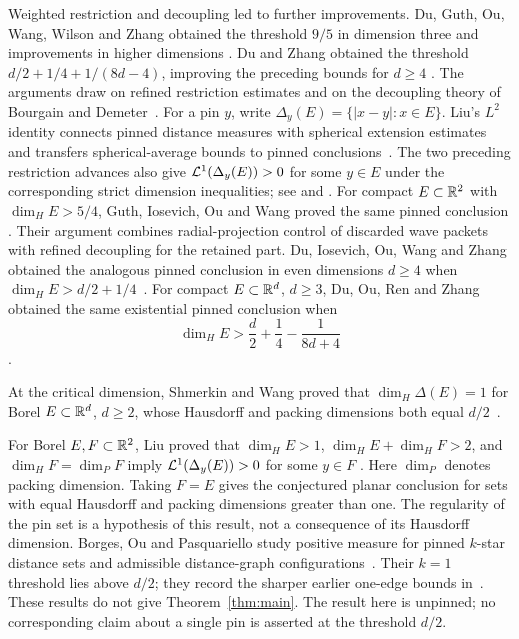 Weighted restriction and decoupling led to further improvements.
Du, Guth, Ou, Wang, Wilson and Zhang obtained the threshold \(9/5\)
in dimension three and improvements in higher dimensions
\cite[Theorem~1.2]{DGOWWZ2021}. Du and Zhang obtained the threshold
\(d/2+1/4+1/(8d-4)\), improving the preceding bounds for \(d\ge4\)
\cite[Theorem~2.6]{DZ2019}.
The arguments draw on refined restriction estimates and on the
decoupling theory of Bourgain and Demeter~\cite{BD2015}.
For a pin \(y\), write
\(\Delta_y(E)=\{|x-y|:x\in E\}\).
Liu's \(L^2\) identity connects pinned distance measures with spherical
extension estimates and transfers spherical-average bounds to pinned
conclusions~\cite[Theorems~1.4 and~1.9]{Liu2019}.
The two preceding restriction advances also give
\(\mathcal L^1(\Delta_y(E))>0\) for some \(y\in E\) under the corresponding
strict dimension inequalities; see \cite[Corollary~1.11]{DGOWWZ2021}
and \cite[Theorem~2.7]{DZ2019}.
For compact \(E\subset\mathbb R^2\) with \(\dim_HE>5/4\),
Guth, Iosevich, Ou and Wang proved the same pinned conclusion
\cite[Theorem~1.2]{GIOW2020}.
Their argument combines radial-projection control of discarded wave
packets with refined decoupling for the retained part.
Du, Iosevich, Ou, Wang and Zhang obtained the analogous pinned conclusion
in even dimensions \(d\ge4\) when
\(\dim_HE>d/2+1/4\)~\cite[Theorem~1.2]{DIOWZ2021}.
For compact \(E\subset\mathbb R^d\), \(d\ge3\), Du, Ou, Ren and Zhang
obtained the same existential pinned conclusion when
\[
 \dim_HE>\frac d2+\frac14-\frac1{8d+4}
\]
\cite[Theorem~1.2]{DORZ2024}.

At the critical dimension, Shmerkin and Wang proved that
\(\dim_H\Delta(E)=1\) for Borel
\(E\subset\mathbb R^d\), \(d\ge2\), whose Hausdorff and packing dimensions
both equal \(d/2\)~\cite[Theorem~1.4]{SW2025}.

For Borel \(E,F\subset\mathbb R^2\), Liu proved that
\(\dim_HE>1\), \(\dim_HE+\dim_HF>2\), and
\(\dim_HF=\dim_PF\) imply
\(\mathcal L^1(\Delta_y(E))>0\) for some \(y\in F\)
\cite[Theorem~1.1]{Liu2026}.
Here \(\dim_P\) denotes packing dimension. Taking \(F=E\)
gives the conjectured planar conclusion for sets with equal
Hausdorff and packing dimensions greater than one.
The regularity of the pin set is a hypothesis of this result, not a
consequence of its Hausdorff dimension. Borges, Ou and Pasquariello
study positive measure for pinned \(k\)-star distance sets and admissible
distance-graph configurations~\cite[Theorem~A and Corollary~1.11]{BOP2026}.
Their \(k=1\) threshold lies above \(d/2\); they record the sharper earlier
one-edge bounds in~\cite[Remark~1.2]{BOP2026}. These results do not give
Theorem~\ref{thm:main}. The result here is unpinned; no corresponding
claim about a single pin is asserted at the threshold \(d/2\).

